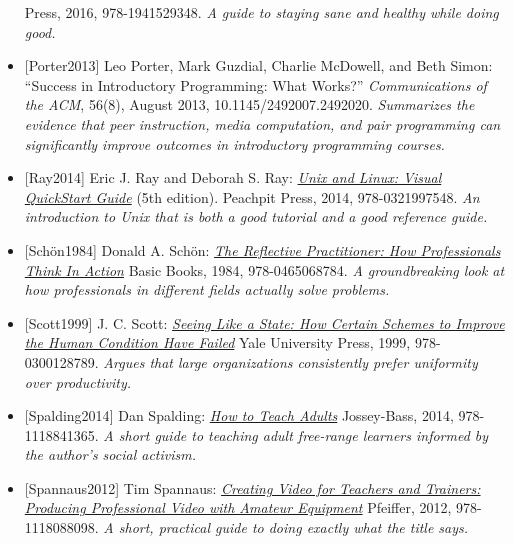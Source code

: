 \documentclass[10pt,statementpaper]{memoir}
\begin{document}
\begin{itemize}
{  Press, 2016, 978-1941529348. \emph{A guide to staying sane and healthy
  while doing good.}}
\item
  \protect\hypertarget{porter-what-works}{}{{[}Porter2013{]}} Leo
  Porter, Mark Guzdial, Charlie McDowell, and Beth Simon: ``Success in
  Introductory Programming: What Works?'' \emph{Communications of the
  ACM}, 56(8), August 2013, 10.1145/2492007.2492020. \emph{Summarizes
  the evidence that peer instruction, media computation, and pair
  programming can significantly improve outcomes in introductory
  programming courses.}
\item
  \protect\hypertarget{ray-ray-unix}{}{{[}Ray2014{]}} Eric J. Ray and
  Deborah S. Ray:
  \emph{\href{https://www.amazon.com/Unix-Linux-Visual-QuickStart-Guide/dp/0321997549/}{Unix
  and Linux: Visual QuickStart Guide}} (5th edition). Peachpit Press,
  2014, 978-0321997548. \emph{An introduction to Unix that is both a
  good tutorial and a good reference guide.}
\item
  \protect\hypertarget{schon-practitioner}{}{{[}Schön1984{]}} Donald A.
  Schön:
  \emph{\href{https://www.amazon.com/Reflective-Practitioner-Professionals-Think-Action/dp/0465068782/}{The
  Reflective Practitioner: How Professionals Think In Action}} Basic
  Books, 1984, 978-0465068784. \emph{A groundbreaking look at how
  professionals in different fields actually solve problems.}
\item
  \protect\hypertarget{scott-state}{}{{[}Scott1999{]}} J. C. Scott:
  \emph{\href{https://www.amazon.com/Seeing-like-State-Certain-Condition/dp/0300078153/}{Seeing
  Like a State: How Certain Schemes to Improve the Human Condition Have
  Failed}} Yale University Press, 1999, 978-0300128789. \emph{Argues
  that large organizations consistently prefer uniformity over
  productivity.}
\item
  \protect\hypertarget{spalding-adults}{}{{[}Spalding2014{]}} {Dan
  Spalding:
  \emph{\href{https://www.amazon.com/How-Teach-Adults-Jossey-Bass-Education/dp/1118841360/}{How
  to Teach Adults}} Jossey-Bass, 2014, 978-1118841365. \emph{A short
  guide to teaching adult free-range learners informed by the author's
  social activism.}}
\item
  \protect\hypertarget{spannaus-video}{}{{[}Spannaus2012{]}} {Tim
  Spannaus:
  \emph{\href{https://www.amazon.com/Creating-Video-Teachers-Trainers-Professional/dp/1118088093/}{Creating
  Video for Teachers and Trainers: Producing Professional Video with
  Amateur Equipment}} Pfeiffer, 2012, 978-1118088098. \emph{A short,
  practical guide to doing exactly what the title says.}}

\end{itemize}
\end{document}
